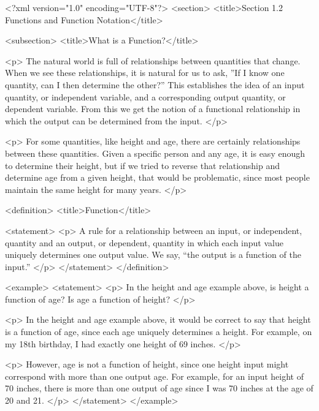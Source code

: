 <?xml version="1.0" encoding="UTF-8"?>
<section>
    <title>Section 1.2 Functions and Function Notation</title>

    <subsection>
        <title>What is a Function?</title>

        <p>
            The natural world is full of relationships between quantities that change.
            When we see these relationships, it is natural for us to ask, ”If I know one quantity, can I then determine the other?” This establishes the idea of an input quantity, or independent variable, and a corresponding output quantity, or dependent variable.
            From this we get the notion of a functional relationship in which the output can be determined from the input.
        </p>

        <p>
            For some quantities, like height and age, there are certainly relationships between these quantities.
            Given a specific person and any age, it is easy enough to determine their height, but if we tried to reverse that relationship and determine age from a given height, that would be problematic, since most people maintain the same height for many years.
        </p>

        <definition>
            <title>Function</title>

            <statement>
                <p>
                    A rule for a relationship between an input, or independent, quantity and an output, or dependent, quantity in which each input value uniquely determines one output value.
                    We say, “the output is a function of the input.”
                </p>
            </statement>
        </definition>

        <example>
            <statement>
                <p>
                    In the height and age example above, is height a function of age? Is age a function of height?
                </p>

                <p>
                    In the height and age example above, it would be correct to say that height is a function of age, since each age uniquely determines a height.
                    For example, on my 18th birthday, I had exactly one height of 69 inches.
                </p>

                <p>
                    However, age is not a function of height, since one height input might correspond with more than one output age.
                    For example, for an input height of 70 inches, there is more than one output of age since I was 70 inches at the age of 20 and 21.
                </p>
            </statement>
        </example>

